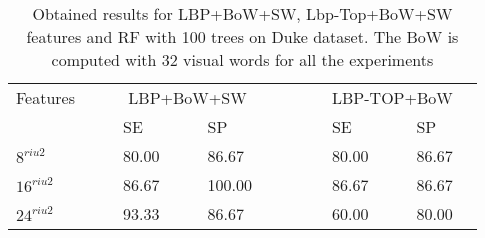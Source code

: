 \begin{table}
\caption{Obtained results for LBP+BoW+SW, Lbp-Top+BoW+SW features and RF with 100 trees on Duke dataset. The BoW is computed with 32 visual words for all the experiments}
\centering
\begin{tabular}{lcclcclcccclcclc}
\toprule
Features 	& & &\multicolumn{4}{c}{LBP+BoW+SW}&	 & & & &\multicolumn{4}{c}{LBP-TOP+BoW} &\\
  \cmidrule(l){2-8}  \cmidrule(l){10-16}  
	       & & & SE & & & SP & & & & & SE & & & SP& \\
\midrule
 $8^{riu2}$ 						& & & 80.00 & & & 86.67 & & & & & 80.00 & & & 86.67 & \\	
 $16^{riu2}$						& & & 86.67 & & & 100.00 & & & & & 86.67 & & & 86.67 & \\	
 $24^{riu2}$						& & & 93.33 & & & 86.67 & & & & & 60.00 & & & 80.00 & \\
\bottomrule
\end{tabular}
\label{tab:DukeBoWResult}
\end{table}



